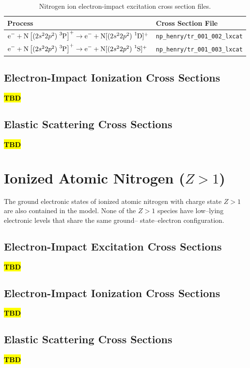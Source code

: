 \documentclass[12pt]{article}
\newcommand{\tbd}{\textcolor{red}{\textbf{\hl{TBD}}}}
\begin{document}
\begin{table}
		\caption{Nitrogen ion electron-impact excitation cross section files.}\label{tab:np_excitation_files}
		\centering
		\begin{tabular}{l l}
				\hline\hline
				Process & Cross Section File\\
				\hline
				$\ce{e-} + \ce{N}\left[(2s^22p^2)\; \ce{^3P}\right]^+ \rightarrow \ce{e-} +\ce{N}[(2s^22p^2)\; \ce{^1D}]^+$ & \texttt{np\_henry/tr\_001\_002\_lxcat}\\
				$\ce{e-} + \ce{N}\left[(2s^22p^2)\; \ce{^3P}\right]^+ \rightarrow \ce{e-} +\ce{N}[(2s^22p^2)\; \ce{^1S}]^+$ & \texttt{np\_henry/tr\_001\_003\_lxcat}\\
				\hline\hline
		\end{tabular}
\end{table}

\subsection{Electron-Impact Ionization Cross Sections} 
\tbd

\subsection{Elastic Scattering Cross Sections}
\tbd

\section{Ionized Atomic Nitrogen ($Z>1$)}
The ground electronic
states of ionized atomic nitrogen with charge state $Z>1$
are also contained in the model. None of the $Z>1$ species
have low–lying electronic levels that share the same ground–
state–electron configuration.

\subsection{Electron-Impact Excitation Cross Sections} 
\tbd

\subsection{Electron-Impact Ionization Cross Sections} 
\tbd

\subsection{Elastic Scattering Cross Sections}
\tbd
\end{document}
